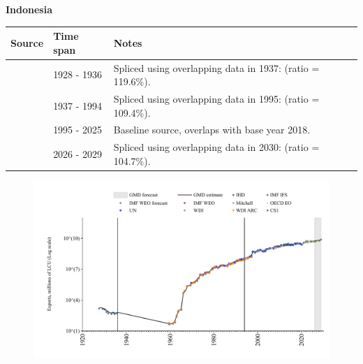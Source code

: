 \documentclass[12pt,a4paper,landscape]{article}
\begin{document}
\begin{adjustbox}{max totalsize={\paperwidth}{\paperheight},center}
\begin{minipage}[t][\textheight][t]{\textwidth}
\vspace*{0.5cm}
{}
\begin{center}
{\Large\bfseries Indonesia}
\end{center}
\vspace{0.5cm}
\begin{table}[H]
\centering
\small
\begin{tabular}{|l|l|l|}
\hline
\textbf{Source} & \textbf{Time span} & \textbf{Notes} \\
\hline
\rowcolor{white}\cite{IHD}& 1928 - 1936 &Spliced using overlapping data in 1937: (ratio = 119.6\%).\\
\rowcolor{lightgray}\cite{WDI}& 1937 - 1994 &Spliced using overlapping data in 1995: (ratio = 109.4\%).\\
\rowcolor{white}\cite{OECD_EO}& 1995 - 2025 &Baseline source, overlaps with base year 2018.\\
\rowcolor{lightgray}\cite{IMF_WEO_forecast}& 2026 - 2029 &Spliced using overlapping data in 2030: (ratio = 104.7\%).\\
\hline
\end{tabular}
\end{table}
\begin{figure}[H]
\centering
\includegraphics[width=\textwidth,height=0.6\textheight,keepaspectratio]{graphs/IDN_exports.pdf}
\end{figure}
\end{minipage}
\end{adjustbox}
\end{document}
